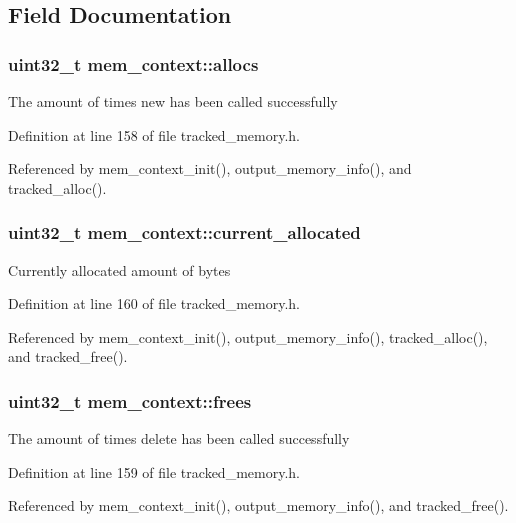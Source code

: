 \subsection{Field Documentation}
\subsubsection[{allocs}]{\setlength{\rightskip}{0pt plus 5cm}uint32\-\_\-t mem\-\_\-context\-::allocs}\label{structmem__context_a3eb8087c0f859202f13e8877f1871530}
The amount of times new has been called successfully 

Definition at line 158 of file tracked\-\_\-memory.\-h.



Referenced by mem\-\_\-context\-\_\-init(), output\-\_\-memory\-\_\-info(), and tracked\-\_\-alloc().

\subsubsection[{current\-\_\-allocated}]{\setlength{\rightskip}{0pt plus 5cm}uint32\-\_\-t mem\-\_\-context\-::current\-\_\-allocated}\label{structmem__context_a8edd1cdf2fb7f8e841eb7abacb839a18}
Currently allocated amount of bytes 

Definition at line 160 of file tracked\-\_\-memory.\-h.



Referenced by mem\-\_\-context\-\_\-init(), output\-\_\-memory\-\_\-info(), tracked\-\_\-alloc(), and tracked\-\_\-free().

\subsubsection[{frees}]{\setlength{\rightskip}{0pt plus 5cm}uint32\-\_\-t mem\-\_\-context\-::frees}\label{structmem__context_a816e6dda100a2b8133c078194cd41f11}
The amount of times delete has been called successfully 

Definition at line 159 of file tracked\-\_\-memory.\-h.



Referenced by mem\-\_\-context\-\_\-init(), output\-\_\-memory\-\_\-info(), and tracked\-\_\-free().


